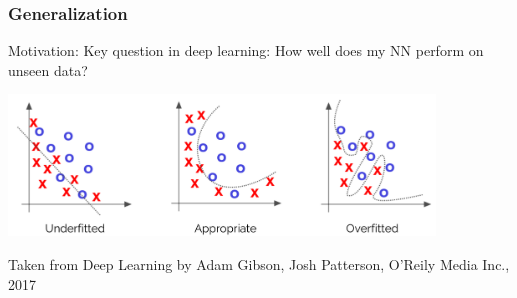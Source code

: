 \begin{frame}
    \frametitle{Generalization}
    \vspace*{0.8cm}
Motivation: Key question in deep learning: How well does my NN perform on unseen data?


\includegraphics[width=0.85\textwidth, height=.5\textheight]{./Ressourcen/Praesentation/Bilder/generalization.png}%

\vspace*{-0.6cm}

Taken from Deep Learning by Adam Gibson, Josh Patterson, O'Reily Media Inc., 2017

\end{frame}
\clearpage


